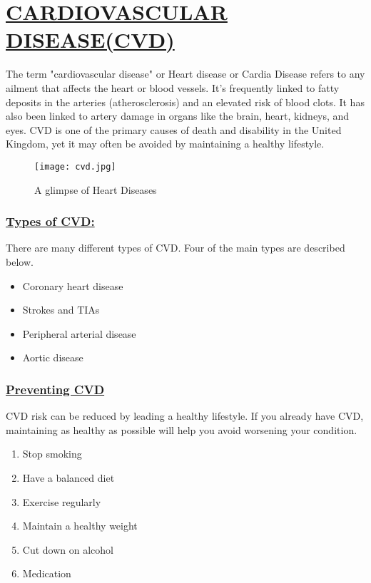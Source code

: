 \documentclass[12pts]{article}
\begin{document}
\section*{\underline{CARDIOVASCULAR DISEASE(CVD)}}
\begin{large}
The term "cardiovascular disease" or Heart disease or Cardia Disease refers to any ailment that affects the heart or blood vessels.
It's frequently linked to fatty deposits in the arteries (atherosclerosis) and an elevated risk of blood clots.
It has also been linked to artery damage in organs like the brain, heart, kidneys, and eyes.
CVD is one of the primary causes of death and disability in the United Kingdom, yet it may often be avoided by maintaining a healthy lifestyle.

\begin{figure}[h]
\centering
\texttt{[image: cvd.jpg]}
\caption{A glimpse of Heart Diseases}
\end{figure}

\subsubsection*{\underline{Types of CVD:}}
\begin{large}
There are many different types of CVD. Four of the main types are described below.
\end{large}
\begin{itemize}
\item Coronary heart disease
\item Strokes and TIAs
\item Peripheral arterial disease
\item Aortic disease
\end{itemize}

\subsubsection*{\underline{Preventing CVD}}
\begin{large}
CVD risk can be reduced by leading a healthy lifestyle. If you already have CVD, maintaining as healthy as possible will help you avoid worsening your condition.
\end{large}
\begin{enumerate}
\item Stop smoking
\item Have a balanced diet
\item Exercise regularly
\item Maintain a healthy weight
\item Cut down on alcohol
\item Medication
\end{enumerate}
\end{large}
\end{document}
